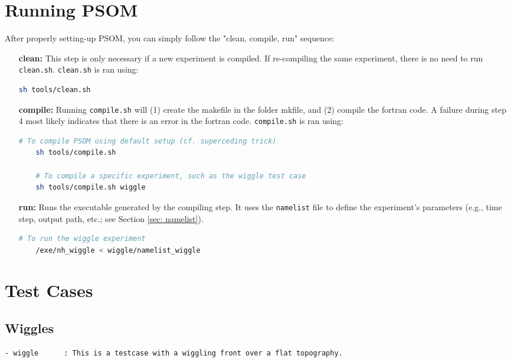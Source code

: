 \documentclass[12pt,letterpaper,titlepage]{article}
\begin{document}
\section{Running PSOM}
\label{sec: cleanconmpilerun}
After properly setting-up PSOM, you can simply follow the "clean, compile, run" sequence:

\begin{itemize}
	\item[\textbf{clean:}] This step is only necessary if a new experiment is compiled. If re-compiling the same experiment, there is no need to run \texttt{clean.sh}. \texttt{clean.sh} is ran using:
\begin{lstlisting}[language=sh, breaklines]
	sh tools/clean.sh
\end{lstlisting}

	\item[\textbf{compile:}] Running \texttt{compile.sh} will (1) create the makefile in the folder mkfile, and (2) compile the fortran code. A failure during step 4 most likely indicates that there is an error in the fortran code. \texttt{compile.sh} is ran using:
\begin{lstlisting}[language=sh, breaklines]
	# To compile PSOM using default setup (cf. superceding trick)
	sh tools/compile.sh
	
	# To compile a specific experiment, such as the wiggle test case
	sh tools/compile.sh wiggle	
\end{lstlisting}
		\item[\textbf{run:}] Runs the executable generated by the compiling step. It uses the \texttt{namelist} file to define the experiment's parameters (e.g., time step, output path, etc.; see Section \ref{sec: namelist}).
\begin{lstlisting}[language=sh, breaklines]
	# To run the wiggle experiment
	/exe/nh_wiggle < wiggle/namelist_wiggle
\end{lstlisting}
\end{itemize}

\section{Test Cases}
\subsection{Wiggles}
\label{sec: Wiggles}
\begin{lstlisting}
- wiggle      : This is a testcase with a wiggling front over a flat topography.  
\end{lstlisting}
\end{document}
